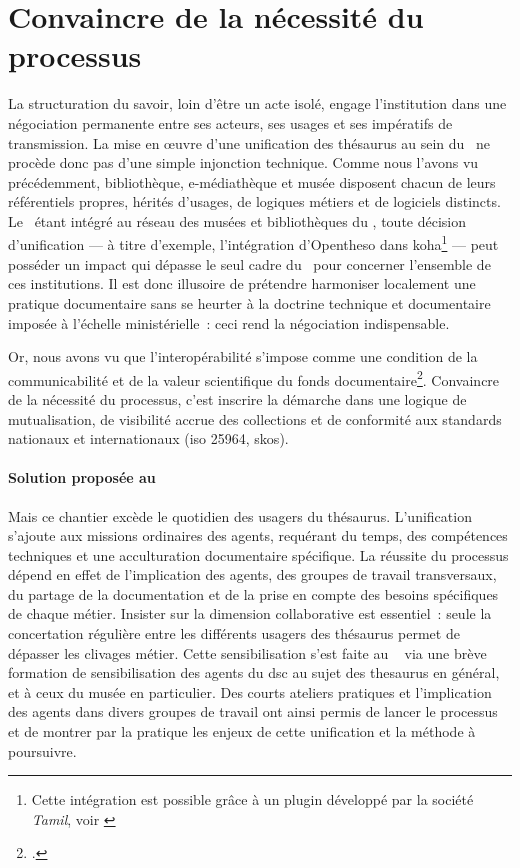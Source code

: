 \section{\label{III-B-1}Convaincre de la nécessité du processus}

La structuration du savoir, loin d’être un acte isolé, engage l’institution dans une négociation permanente entre ses acteurs, ses usages et ses impératifs de transmission. La mise en œuvre d’une unification des thésaurus au sein du \mae~ne procède donc pas d’une simple injonction technique. Comme nous l'avons vu précédemment, bibliothèque, e-médiathèque et musée disposent chacun de leurs référentiels propres, hérités d’usages, de logiques métiers et de logiciels distincts. Le \mae~étant intégré au réseau des musées et bibliothèques du \minarm, toute décision d’unification --- à titre d’exemple, l’intégration d’Opentheso dans \gls{koha}\footnote{Cette intégration est possible grâce à un plugin développé par la société \textit{Tamil}, voir \cite{PluginTamilOpentheso}} --- peut posséder un impact qui dépasse le seul cadre du \mae~pour concerner l'ensemble de ces institutions. Il est donc illusoire de prétendre harmoniser localement une pratique documentaire sans se heurter à la doctrine technique et documentaire imposée à l’échelle ministérielle~: ceci rend la négociation indispensable.

Or, nous avons vu que l’interopérabilité s’impose comme une condition de la communicabilité et de la valeur scientifique du fonds documentaire\footcite{hudonISO25964Pour2012a, maroyeISO25964Distinction2015}. Convaincre de la nécessité du processus, c’est inscrire la démarche dans une logique de mutualisation, de visibilité accrue des collections et de conformité aux standards nationaux et internationaux (\gls{iso} 25964, \gls{skos}).

\paragraph*{Solution proposée au \mae}
Mais ce chantier excède le quotidien des usagers du thésaurus. L’unification s’ajoute aux missions ordinaires des agents, requérant du temps, des compétences techniques et une acculturation documentaire spécifique. La réussite du processus dépend en effet de l’implication des agents, des groupes de travail transversaux, du partage de la documentation et de la prise en compte des besoins spécifiques de chaque métier. Insister sur la dimension collaborative est essentiel~: seule la concertation régulière entre les différents usagers des thésaurus permet de dépasser les clivages métier. Cette sensibilisation s'est faite au \mae~ via une brève formation de sensibilisation des agents du \ac{dsc} au sujet des \gls{thesaurus} en général, et à ceux du musée en particulier. Des courts ateliers pratiques et l'implication des agents dans divers groupes de travail ont ainsi permis de lancer le processus et de montrer par la pratique les enjeux de cette unification et la méthode à poursuivre.